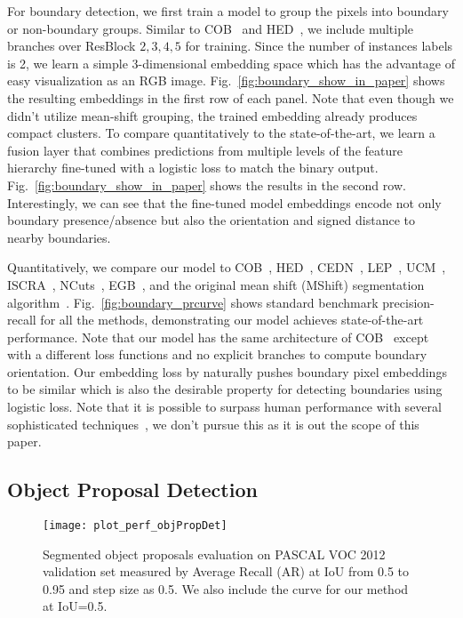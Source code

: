 For boundary detection, we first train a model to group the pixels into
boundary or non-boundary groups.  Similar to
COB~\cite{maninis2017convolutional} and HED~\cite{xie2015holistically}, we
include multiple branches over ResBlock $2, 3, 4, 5$ for training.
Since the number of instances labels is 2, we learn a simple 3-dimensional
embedding space which has the advantage of easy visualization as an RGB
image.  Fig.~\ref{fig:boundary_show_in_paper} shows the resulting embeddings
in the first row of each panel.  Note that even though we didn't utilize
mean-shift grouping, the trained embedding already produces compact clusters.
To compare quantitatively to the state-of-the-art, we learn a fusion
layer that combines predictions from multiple levels of the feature
hierarchy fine-tuned with a logistic loss to match the binary output.
Fig.~\ref{fig:boundary_show_in_paper} shows the results in the second row.
Interestingly, we can see that the fine-tuned model embeddings
encode not only boundary presence/absence but also the orientation
and signed distance to nearby boundaries.

Quantitatively,
we compare our model to
COB~\cite{maninis2017convolutional},
HED~\cite{xie2015holistically},
CEDN~\cite{yang2016object},
LEP~\cite{najman1996geodesic},
UCM~\cite{arbelaez2011contour},
ISCRA~\cite{ren2013image},
NCuts~\cite{shi2000normalized},
EGB~\cite{felzenszwalb2004efficient},
and the original mean shift (MShift) segmentation algorithm~\cite{comaniciu2002mean}.
Fig.~\ref{fig:boundary_prcurve} shows standard benchmark precision-recall for
all the methods, demonstrating our model achieves state-of-the-art performance.
Note that our model has the same architecture of COB~\cite{maninis2017convolutional}
except with a different
loss functions and no explicit branches to compute boundary orientation.  Our
embedding loss by naturally pushes boundary pixel embeddings to be similar
which is also the desirable property for detecting boundaries using logistic
loss.  Note that it is possible to surpass human performance with several
sophisticated techniques~\cite{kokkinos2015pushing}, we don't pursue
this as it is out the scope of this paper.


\subsection{Object Proposal Detection}
\begin{figure}[t]
\centering
   \texttt{[image: plot\_perf\_objPropDet]}
   \vspace{-6mm}
   \caption{Segmented object proposals evaluation on PASCAL VOC 2012 validation
   set measured by Average Recall (AR) at IoU from 0.5 to 0.95 and step size as 0.5.
   We also include the curve for our method at IoU=0.5.
   }
\label{fig:plot_perf_objPropDet}
\end{figure}


